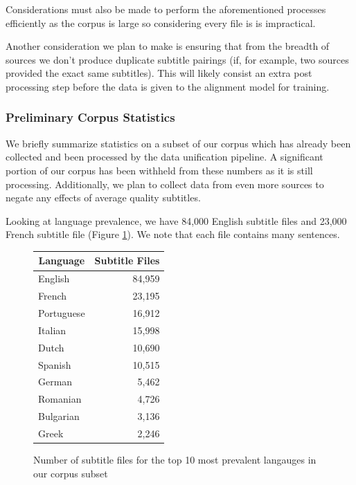 \documentclass[twoside,twocolumn]{article}
\begin{document}
Considerations must also be made to perform the aforementioned processes
efficiently as the corpus is large so considering every file is is impractical.

Another consideration we plan to make is ensuring that from the breadth of
sources we don't produce duplicate subtitle pairings (if, for example, two
sources provided the exact same subtitles). This will likely consist an
extra post processing step before the data is given to the alignment model for
training.


\subsubsection{Preliminary Corpus Statistics}

We briefly summarize statistics on a subset of our corpus which has already
been collected and been processed by the data unification pipeline. A
significant portion of our corpus has been withheld from these numbers as it
is still processing. Additionally, we plan to collect data from even more
sources to negate any effects of average quality subtitles.

Looking at language prevalence, we have 84,000 English subtitle files and
23,000 French subtitle file (Figure \ref{fig:language-prevalence}). We note
that each file contains many sentences.

\begin{figure}[ht]
    \centering
    \begin{tabular}{ |l|r| }
        \hline
        \multicolumn{1}{|c|}{\textbf{Language}} &
            \multicolumn{1}{|c|}{\textbf{Subtitle Files}} \\
        \hline
        English    & 84,959 \\  \hline
        French     & 23,195 \\  \hline
        Portuguese & 16,912 \\  \hline
        Italian    & 15,998 \\  \hline
        Dutch      & 10,690 \\  \hline
        Spanish    & 10,515 \\  \hline
        German     & 5,462  \\  \hline
        Romanian   & 4,726  \\  \hline
        Bulgarian  & 3,136  \\  \hline
        Greek      & 2,246  \\  \hline
    \end{tabular}

    \caption{Number of subtitle files for the top 10 most prevalent langauges
             in our corpus subset}
    \label{fig:language-prevalence}
\end{figure}
\end{document}
